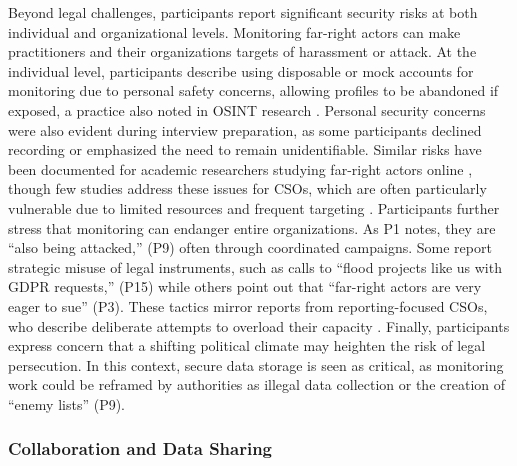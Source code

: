 \documentclass[acmsmall]{acmart}
\begin{document}
Beyond legal challenges, participants report significant security risks at both individual and organizational levels. Monitoring far-right actors can make practitioners and their organizations targets of harassment or attack.
At the individual level, participants describe using disposable or mock accounts for monitoring due to personal safety concerns, allowing profiles to be abandoned if exposed, a practice also noted in OSINT research \cite{mckeown_investigating_2014}. Personal security concerns were also evident during interview preparation, as some participants declined recording or emphasized the need to remain unidentifiable. Similar risks have been documented for academic researchers studying far-right actors online \cite{massanari_rethinking_2018,conway_online_2021}, though few studies address these issues for CSOs, which are often particularly vulnerable due to limited resources and frequent targeting \cite{samarin_surveying_2020}.
Participants further stress that monitoring can endanger entire organizations. As P1 notes, they are ``also being attacked,'' (P9) often through coordinated campaigns. Some report strategic misuse of legal instruments, such as calls to ``flood projects like us with GDPR requests,'' (P15) while others point out that ``far-right actors are very eager to sue'' (P3). These tactics mirror reports from reporting-focused CSOs, who describe deliberate attempts to overload their capacity \cite{baumler_harnessing_2025}.
Finally, participants express concern that a shifting political climate may heighten the risk of legal persecution. In this context, secure data storage is seen as critical, as monitoring work could be reframed by authorities as illegal data collection or the creation of ``enemy lists'' (P9).

\subsubsection{Collaboration and Data Sharing} 
\label{sssec:collaboration}
\end{document}

